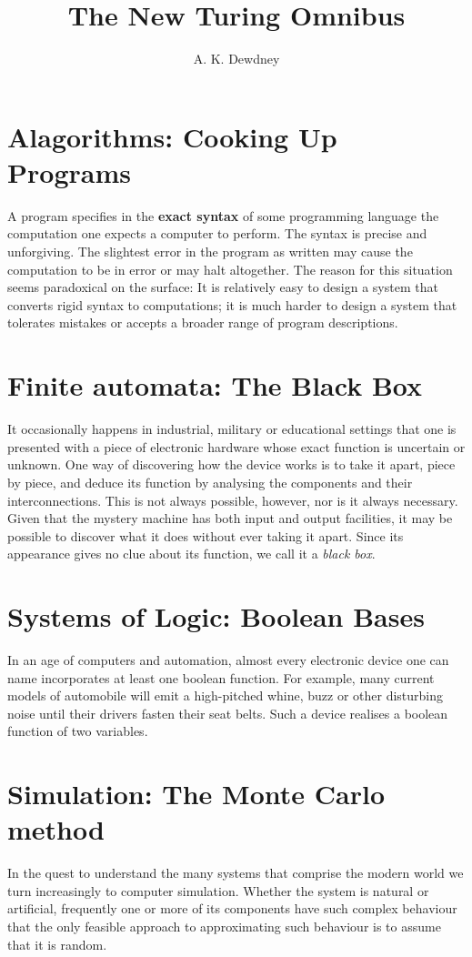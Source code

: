 \documentclass[a4paper]{article}
\begin{document}
\title{The New Turing Omnibus}
\author{A. K. Dewdney}
\maketitle
\tableofcontents
\newpage


\section{Alagorithms: Cooking Up Programs}
A program specifies in the \textbf{exact syntax} of some programming language the computation one expects a computer to perform. The syntax is precise and unforgiving. The slightest error in the program as written may cause the computation to be in error or may halt altogether. The reason for this situation seems paradoxical on the surface: It is relatively easy to design a system that converts rigid syntax to computations; it is much harder to design a system that tolerates mistakes or accepts a broader range of program descriptions.

\section{Finite automata: The Black Box}
It occasionally happens in industrial, military or educational settings that one is presented with a piece of electronic hardware whose exact function is uncertain or unknown. One way of discovering how the device works is to take it apart, piece by piece, and deduce its function by analysing the components and their interconnections. This is not always possible, however, nor is it always necessary. Given that the mystery machine has both input and output facilities, it may be possible to discover what it does without ever taking it apart. Since its appearance gives no clue about its function, we call it a \textit{black box}.

\section{Systems of Logic: Boolean Bases}
In an age of computers and automation, almost every electronic device one can name incorporates at least one boolean function. For example, many current models of automobile will emit a high-pitched whine, buzz or other disturbing noise until their drivers fasten their seat belts. Such a device realises a boolean function of two variables.

\section{Simulation: The Monte Carlo method}
In the quest to understand the many systems that comprise the modern world we turn increasingly to computer simulation. Whether the system is natural or artificial, frequently one or more of its components have such complex behaviour that the only feasible approach to approximating such behaviour is to assume that it is random.
\end{document}
